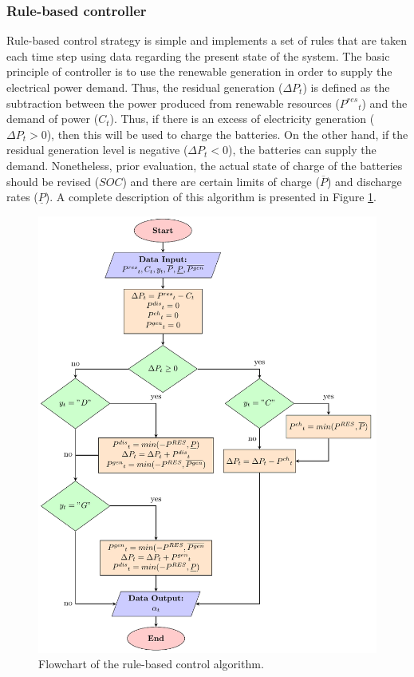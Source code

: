 \documentclass{ECOS_2019}
\begin{document}
\subsubsection{Rule-based controller}
Rule-based control strategy is simple and implements a set of rules that are taken each time step using data regarding the present state of the system. The basic principle of controller is to use the renewable generation in order to supply the electrical power demand\cite{Totaro2021}. Thus, the residual generation ($\Delta P_t$) is defined as the subtraction between the power produced from renewable resources (${P^{res}}_t$) and the demand of power ($C_t$). Thus, if there is an excess of electricity generation ($\Delta P_t>0$), then this will be used to charge the batteries. On the other hand, if the residual generation level is negative ($\Delta P_t<0$), the batteries can supply the demand. Nonetheless, prior evaluation, the actual state of charge of the batteries should be revised ($SOC$) and there are certain limits of charge ($\overline{P}$) and discharge rates ($\underline{P}$). A complete description of this algorithm is presented in Figure \ref{fig_rule_based_controller}.
\begin{figure}[h!]
    \centering
    \includegraphics[scale=0.8]{Figures/Rule_based_controller.pdf}
    \caption{Flowchart of the rule-based control algorithm.}
    \label{fig_rule_based_controller}
\end{figure}
\end{document}
